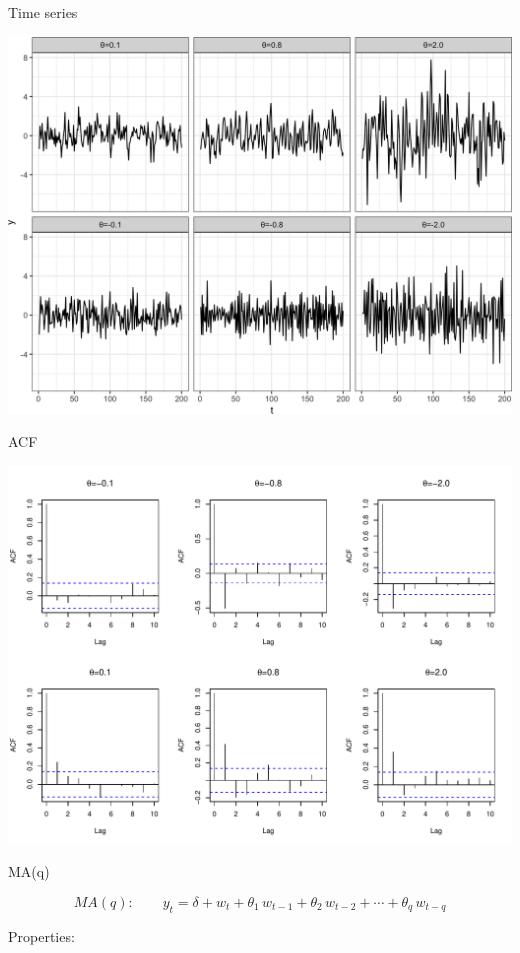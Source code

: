 \documentclass[11pt,ignorenonframetext,]{beamer}
\begin{document}
\begin{frame}{Time series}

\includegraphics{Lec8_files/figure-beamer/unnamed-chunk-1-1.png}

\end{frame}

\begin{frame}{ACF}

\includegraphics{Lec8_files/figure-beamer/unnamed-chunk-2-1.pdf}

\end{frame}

\begin{frame}[t]{MA(q)}

\[ MA(q): \qquad y_t = \delta + w_t + \theta_1 \, w_{t-1} + \theta_2 \, w_{t-2} + \cdots + \theta_q \, w_{t-q} \]

Properties:

\end{frame}
\end{document}
